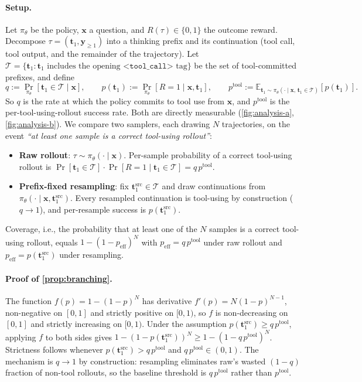 \documentclass{llmxive}
\providecommand{\bm}[1]{\boldsymbol{#1}}
\providecommand{\toolcall}{\texttt{<tool\_call>}\xspace}
\providecommand{\vt}{{\bm{t}}}
\providecommand{\vx}{{\bm{x}}}
\providecommand{\vy}{{\bm{y}}}
\begin{document}
\paragraph{Setup.}
Let $\pi_\theta$ be the policy, $\vx$ a question, and $R(\tau) \in \{0,1\}$ the outcome reward. Decompose $\tau = (\vt_1, \vy_{\geq 1})$ into a thinking prefix and its continuation (tool call, tool output, and the remainder of the trajectory). Let $\mathcal{T} = \{\vt_1 : \vt_1 \text{ includes the opening } \toolcall \text{ tag}\}$ be the set of tool-committed prefixes, and define
\[
    q := \Pr_{\pi_\theta}[\vt_1 \in \mathcal{T} \mid \vx], \qquad
    p(\vt_1) := \Pr_{\pi_\theta}[R=1 \mid \vx, \vt_1], \qquad
    p^{\text{tool}} := \mathbb{E}_{\vt_1 \sim \pi_\theta(\cdot \mid \vx,\, \vt_1 \in \mathcal{T})}[p(\vt_1)].
\]
So $q$ is the rate at which the policy commits to tool use from $\vx$, and $p^{\text{tool}}$ is the per-tool-using-rollout success rate. Both are directly measurable (\autoref{fig:analysis-a}, \autoref{fig:analysis-b}). We compare two samplers, each drawing $N$ trajectories, on the event \emph{``at least one sample is a correct tool-using rollout''}:
\begin{itemize}[leftmargin=*, topsep=2pt, itemsep=1pt]
    \item \textbf{Raw rollout}: $\tau \sim \pi_\theta(\cdot \mid \vx)$. Per-sample probability of a correct tool-using rollout is $\Pr[\vt_1 \in \mathcal{T}] \cdot \Pr[R=1 \mid \vt_1 \in \mathcal{T}] = q\, p^{\text{tool}}$.
    \item \textbf{Prefix-fixed resampling}: fix $\vt_1^{\text{src}} \in \mathcal{T}$ and draw continuations from $\pi_\theta(\cdot \mid \vx, \vt_1^{\text{src}})$. Every resampled continuation is tool-using by construction ($q \to 1$), and per-resample success is $p(\vt_1^{\text{src}})$.
\end{itemize}
Coverage, i.e., the probability that at least one of the $N$ samples is a correct tool-using rollout, equals $1 - (1-p_{\text{eff}})^N$ with $p_{\text{eff}} = q\, p^{\text{tool}}$ under raw rollout and $p_{\text{eff}} = p(\vt_1^{\text{src}})$ under resampling.

\paragraph{Proof of \autoref{prop:branching}.}
The function $f(p) = 1 - (1-p)^N$ has derivative $f'(p) = N(1-p)^{N-1}$, non-negative on $[0,1]$ and strictly positive on $[0,1)$, so $f$ is non-decreasing on $[0,1]$ and strictly increasing on $[0,1)$. Under the assumption $p(\vt_1^{\text{src}}) \geq q\, p^{\text{tool}}$, applying $f$ to both sides gives $1 - (1-p(\vt_1^{\text{src}}))^N \geq 1 - (1 - q\, p^{\text{tool}})^N$. Strictness follows whenever $p(\vt_1^{\text{src}}) > q\, p^{\text{tool}}$ and $q\, p^{\text{tool}} \in (0,1)$. The mechanism is $q \to 1$ by construction: resampling eliminates raw's wasted $(1-q)$ fraction of non-tool rollouts, so the baseline threshold is $q\, p^{\text{tool}}$ rather than $p^{\text{tool}}$.
\end{document}
